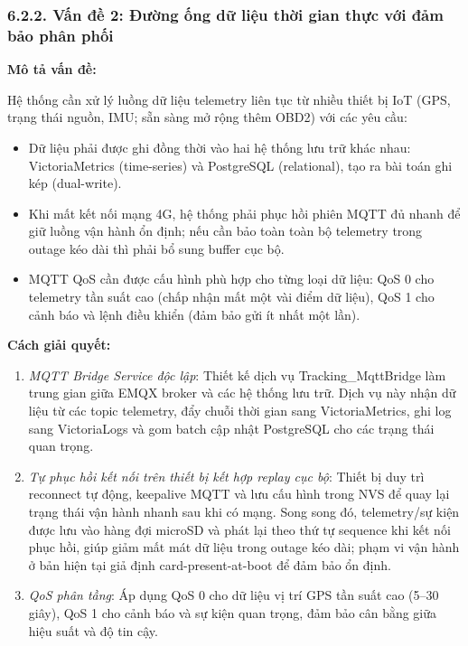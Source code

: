 \documentclass[13pt,a4paper]{extarticle}
\renewcommand{\\}{\thesislongtableorignewline\hline}%
\providecommand{\tightlist}{%
  \setlength{\itemsep}{0pt}\setlength{\parskip}{0pt}}
\begin{document}
\subsubsection{6.2.2. Vấn đề 2: Đường ống dữ liệu thời gian thực với đảm
bảo phân
phối}\label{622-vux1ea5n-ux111ux1ec1-2-ux111ux1b0ux1eddng-ux1ed1ng-dux1eef-liux1ec7u-thux1eddi-gian-thux1ef1c-vux1edbi-ux111ux1ea3m-bux1ea3o-phuxe2n-phux1ed1i}

\textbf{Mô tả vấn đề:}

Hệ thống cần xử lý luồng dữ liệu telemetry liên tục từ nhiều thiết bị
IoT (GPS, trạng thái nguồn, IMU; sẵn sàng mở rộng thêm OBD2) với các yêu
cầu:

\begin{itemize}
\tightlist
\item
  Dữ liệu phải được ghi đồng thời vào hai hệ thống lưu trữ khác nhau:
  VictoriaMetrics (time-series) và PostgreSQL (relational), tạo ra bài
  toán ghi kép (dual-write).
\item
  Khi mất kết nối mạng 4G, hệ thống phải phục hồi phiên MQTT đủ nhanh để
  giữ luồng vận hành ổn định; nếu cần bảo toàn toàn bộ telemetry trong
  outage kéo dài thì phải bổ sung buffer cục bộ.
\item
  MQTT QoS cần được cấu hình phù hợp cho từng loại dữ liệu: QoS 0 cho
  telemetry tần suất cao (chấp nhận mất một vài điểm dữ liệu), QoS 1 cho
  cảnh báo và lệnh điều khiển (đảm bảo gửi ít nhất một lần).
\end{itemize}

\textbf{Cách giải quyết:}

\begin{enumerate}
\def\labelenumi{\arabic{enumi}.}
\tightlist
\item
  \emph{MQTT Bridge Service độc lập}: Thiết kế dịch vụ
  Tracking\_MqttBridge làm trung gian giữa EMQX broker và các hệ thống
  lưu trữ. Dịch vụ này nhận dữ liệu từ các topic telemetry, đẩy chuỗi
  thời gian sang VictoriaMetrics, ghi log sang VictoriaLogs và gom batch
  cập nhật PostgreSQL cho các trạng thái quan trọng.
\item
  \emph{Tự phục hồi kết nối trên thiết bị kết hợp replay cục bộ}: Thiết
  bị duy trì reconnect tự động, keepalive MQTT và lưu cấu hình trong NVS
  để quay lại trạng thái vận hành nhanh sau khi có mạng. Song song đó,
  telemetry/sự kiện được lưu vào hàng đợi microSD và phát lại theo thứ
  tự sequence khi kết nối phục hồi, giúp giảm mất mát dữ liệu trong
  outage kéo dài; phạm vi vận hành ở bản hiện tại giả định
  card-present-at-boot để đảm bảo ổn định.
\item
  \emph{QoS phân tầng}: Áp dụng QoS 0 cho dữ liệu vị trí GPS tần suất
  cao (5--30 giây), QoS 1 cho cảnh báo và sự kiện quan trọng, đảm bảo
  cân bằng giữa hiệu suất và độ tin cậy.
\end{enumerate}
\end{document}

